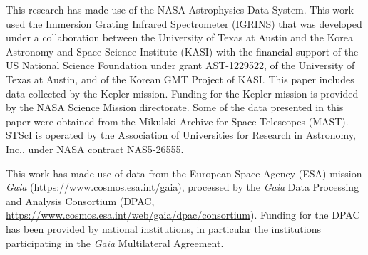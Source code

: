 \documentclass[modern,trackchanges]{aastex631}
\begin{document}
\begin{acknowledgements}

This research has made use of the NASA Astrophysics Data System.
This work used the Immersion Grating Infrared Spectrometer (IGRINS) that was developed under a collaboration between the University of Texas at Austin and the Korea Astronomy and Space Science Institute (KASI) with the financial support of the US National Science Foundation under grant AST-1229522, of the University of Texas at Austin, and of the Korean GMT Project of KASI.
This paper includes data collected by the Kepler mission. Funding for the Kepler mission is provided by the NASA Science Mission directorate.
Some of the data presented in this paper were obtained from the Mikulski Archive for Space Telescopes (MAST). STScI is operated by the Association of Universities for Research in Astronomy, Inc., under NASA contract NAS5-26555.

This work has made use of data from the European Space Agency (ESA) mission
{\it Gaia} (\url{https://www.cosmos.esa.int/gaia}), processed by the {\it Gaia}
Data Processing and Analysis Consortium (DPAC,
\url{https://www.cosmos.esa.int/web/gaia/dpac/consortium}). Funding for the DPAC
has been provided by national institutions, in particular the institutions
participating in the {\it Gaia} Multilateral Agreement.

\end{acknowledgements}



\clearpage


\end{document}
